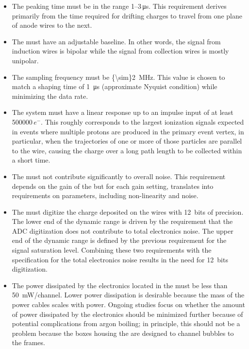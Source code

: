 \begin{itemize}
\item{The  peaking time must  %
be  in the range \numrange{1}{3}\,\si{\micro\second}.  This requirement derives primarily from the time required for drifting charges to travel from one plane of anode wires to the next.}
\item{The  must %
 have an adjustable baseline.  In other words, the signal from induction wires is bipolar while the signal from  collection wires is mostly unipolar.}
\item{The  sampling frequency must %
be \SI{{\sim}2}{MHz}.  This value is chosen to match a  shaping time of \SI{1}{\micro\second} (approximate Nyquist condition) while minimizing the data rate.}
\item{The system must have a linear response up to an impulse input of at least \num{500000}\,$e^{-}$.  This roughly corresponds to the largest ionization signals expected in events where multiple protons are produced in the primary event vertex, in particular, when the trajectories of one or more of those particles are parallel to the wire, causing the charge over a long path length to be collected within a short time.}
\item{The  must not contribute significantly to overall  noise. This requirement depends on the gain of the  but for each gain setting, translates into requirements on  parameters, including non-linearity and noise.}
\item{The  must digitize the charge deposited on the wires with 12~bits of precision.  The lower end of the  dynamic range is driven by the requirement that the ADC digitization does not contribute to total electronics noise. The upper end of the  dynamic range is defined by the previous requirement for the signal saturation level. Combining these two requirements with the specification for the total electronics noise results in the need for 12~bits digitization.}
\item{The power dissipated by the electronics located in the  must 
be less than \SI{50}{mW/channel}.  Lower power dissipation is desirable because the mass of the power cables scales with  power.  Ongoing studies focus on whether the amount of power dissipated by the electronics should be minimized further because of potential complications from argon boiling; in principle, this should not be a problem because the  boxes housing the  are designed to channel bubbles to the  frames.}
\end{itemize}

